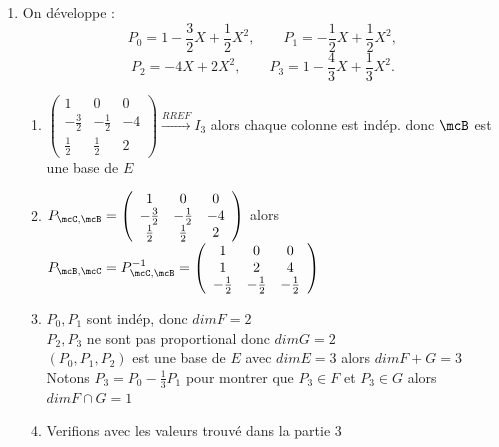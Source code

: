 \documentclass[12pt, a4paper]{article}
\begin{document}
\begin{enumerate}
    \pagebreak
  \item On développe :
    \[
    P_0=1-\frac32X+\frac12X^2,\qquad
    P_1=-\frac12X+\frac12X^2,
    \]
    \[
    P_2=-4X+2X^2,\qquad
    P_3=1-\frac43X+\frac13X^2.
    \]
    \begin{enumerate}[\arabic*.]
      \item $\left(\begin{array}{ccc} 1 & 0 & 0\\ -\frac{3}{2} & -\frac{1}{2} & -4\\ \frac{1}{2} & \frac{1}{2} & 2 \end{array}\right) \xrightarrow{RREF} I_3$ alors chaque colonne est indép. donc $\mcB$ est une base de $E$

      \item $P_{\mcC, \mcB} = \left(\begin{array}{ccc} 1 & 0 & 0\\ -\frac{3}{2} & -\frac{1}{2} & -4\\ \frac{1}{2} & \frac{1}{2} & 2 \end{array}\right)$ alors $P_{\mcB, \mcC} = P_{\mcC, \mcB}^{-1} = \left(\begin{array}{ccc} 1 & 0 & 0\\ 1 & 2 & 4\\ -\frac{1}{2} & -\frac{1}{2} & -\frac{1}{2} \end{array}\right)$

      \item $P_0, P_1$ sont indép, donc $dim F = 2$\\ 
        $P_2, P_3$ ne sont pas proportional donc $dim G = 2$\\
        $(P_0, P_1, P_2)$ est une base de $E$ avec $dim E = 3$ alors $dim F+G = 3$\\
        Notons $P_3 = P_0 - \frac{1}{3}P_1$ pour montrer que $P_3 \in F$ et $P_3 \in G$ alors $dim F \cap G = 1$

      \item Verifions avec les valeurs trouvé dans la partie 3
    \end{enumerate}
\end{enumerate}
\end{document}
